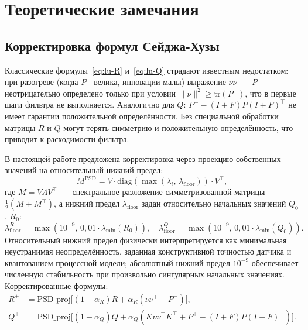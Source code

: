 \documentclass[a4paper,14pt]{extarticle}
\begin{document}
\section{Теоретические замечания}
\label{sec:theory}

\subsection{Корректировка формул Сейджа-Хузы}

Классические формулы~\eqref{eq:lu-R} и~\eqref{eq:lu-Q} страдают известным недостатком: при разогреве (когда $P^-$ велика, инновации малы) выражение $\nu\nu^\top - P^-$ неотрицательно определено только при условии $\|\nu\|^2 \geq \mathrm{tr}(P^-)$, что в первые шаги фильтра не выполняется. Аналогично для $Q$: $P^+ - (I+F)P(I+F)^\top$ не имеет гарантии положительной определённости. Без специальной обработки матрицы $R$ и $Q$ могут терять симметрию и положительную определённость, что приводит к расходимости фильтра.

В настоящей работе предложена корректировка через проекцию собственных значений на относительный нижний предел:
\begin{equation}
M^{\text{PSD}} = V \cdot \mathrm{diag}(\max(\lambda_i,\,\lambda_{\text{floor}})) \cdot V^\top,
\label{eq:psd-proj}
\end{equation}
где $M = V \Lambda V^\top$~--- спектральное разложение симметризованной матрицы $\frac{1}{2}(M + M^\top)$, а нижний предел $\lambda_{\text{floor}}$ задан относительно начальных значений $Q_0$, $R_0$:
\begin{equation}
\lambda_{\text{floor}}^{R} = \max(10^{-9},\, 0{,}01 \cdot \lambda_{\min}(R_0)), \quad
\lambda_{\text{floor}}^{Q} = \max(10^{-9},\, 0{,}01 \cdot \lambda_{\min}(Q_0)).
\label{eq:psd-floor}
\end{equation}
Относительный нижний предел физически интерпретируется как минимальная неустранимая неопределённость, заданная конструктивной точностью датчика и квантованием процессной модели; абсолютный нижний предел $10^{-9}$ обеспечивает численную стабильность при произвольно сингулярных начальных значениях. Корректированные формулы:
\begin{align}
R^+ &= \mathrm{PSD\_proj}\!\bigl[(1-\alpha_R) R + \alpha_R (\nu\nu^\top - P^-)\bigr], \label{eq:R-corrected}\\
Q^+ &= \mathrm{PSD\_proj}\!\bigl[(1-\alpha_Q) Q + \alpha_Q (K\nu\nu^\top K^\top + P^+ - (I+F)P(I+F)^\top)\bigr]. \label{eq:Q-corrected}
\end{align}
\end{document}
